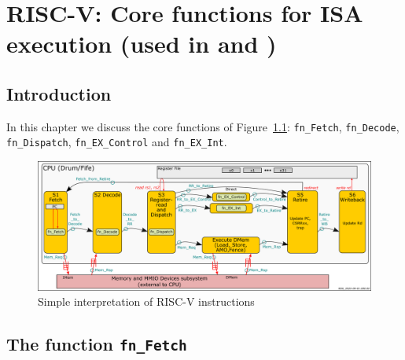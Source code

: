 

\chapter{RISC-V: Core functions for ISA execution (used in {\DRUM} and {\FIFE})}


\setcounter{page}{1}
\renewcommand{\thepage}{\arabic{chapter}-\arabic{page}}

\label{ch_core_functions}


\section{Introduction}

In this chapter we discuss the core functions of
Figure~\ref{Fig_Core_Simple_Instr_Exec}: \verb|fn_Fetch|,
\verb|fn_Decode|, \verb|fn_Dispatch|, \verb|fn_EX_Control| and
\verb|fn_EX_Int|.
\begin{figure}[htbp]
  \centerline{\includegraphics[width=6in,angle=0]{Figures/RSN_2025-09-01.000.00_FifeDrum_Stages_Multilayer_L1_L3}}
  \caption{\label{Fig_Core_Simple_Instr_Exec}
           Simple interpretation of RISC-V instructions}
\end{figure}


\section{The function {\tt fn\_Fetch}}

